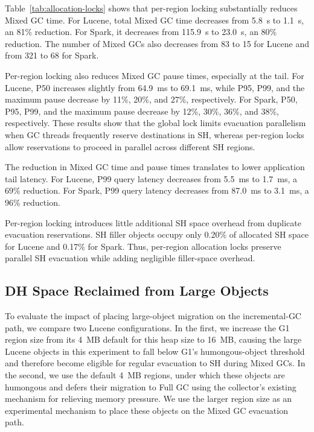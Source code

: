 Table~\ref{tab:allocation-locks} shows that per-region locking substantially reduces Mixed GC time.
For Lucene, total Mixed GC time decreases from 5.8~s to 1.1~s, an 81\% reduction.
For Spark, it decreases from 115.9~s to 23.0~s, an 80\% reduction.
The number of Mixed GCs also decreases from 83 to 15 for Lucene and from 321 to 68 for Spark.

Per-region locking also reduces Mixed GC pause times, especially at the tail.
For Lucene, P50 increases slightly from 64.9~ms to 69.1~ms, while P95, P99, and the maximum pause decrease by 11\%, 20\%, and 27\%, respectively.
For Spark, P50, P95, P99, and the maximum pause decrease by 12\%, 30\%, 36\%, and 38\%, respectively.
These results show that the global lock limits evacuation parallelism when GC threads frequently reserve destinations in SH, whereas per-region locks allow reservations to proceed in parallel across different SH regions.

The reduction in Mixed GC time and pause times translates to lower application tail latency.
For Lucene, P99 query latency decreases from 5.5~ms to 1.7~ms, a 69\% reduction.
For Spark, P99 query latency decreases from 87.0~ms to 3.1~ms, a 96\% reduction.

Per-region locking introduces little additional SH space overhead from duplicate evacuation reservations.
SH filler objects occupy only 0.20\% of allocated SH space for Lucene and 0.17\% for Spark.
Thus, per-region allocation locks preserve parallel SH evacuation while adding negligible filler-space overhead.

\subsection{DH Space Reclaimed from Large Objects}
\label{sec:eval-large}

To evaluate the impact of placing large-object migration on the incremental-GC path, we compare two Lucene configurations.
In the first, we increase the G1 region size from its \SI{4}{MB} default for this heap size to \SI{16}{MB}, causing the large Lucene objects in this experiment to fall below G1's humongous-object threshold and therefore become eligible for regular evacuation to SH during Mixed GCs.
In the second, we use the default \SI{4}{MB} regions, under which these objects are humongous and \chipperName{} defers their migration to Full GC using the collector's existing mechanism for relieving memory pressure.
We use the larger region size as an experimental mechanism to place these objects on the Mixed GC evacuation path.

